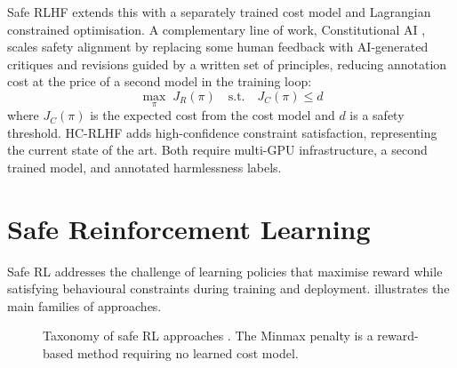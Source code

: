 \documentclass[a4paper,twoside,12pt]{report}
\begin{document}
Safe RLHF \citep{dai2024saferlhf} extends this with a separately trained cost model and
Lagrangian constrained optimisation. A complementary line of work, Constitutional AI
\citep{bai2022constitutional}, scales safety alignment by replacing some human feedback
with AI-generated critiques and revisions guided by a written set of principles, reducing
annotation cost at the price of a second model in the training loop:
\begin{equation}
  \max_{\pi}\; J_R(\pi) \quad \text{s.t.}\quad J_C(\pi) \leq d
  \label{eq:safe_rlhf}
\end{equation}
where $J_C(\pi)$ is the expected cost from the cost model and $d$ is a safety threshold.
HC-RLHF \citep{chittepu2025} adds high-confidence constraint satisfaction, representing the
current state of the art. Both require multi-GPU infrastructure, a second trained model, and
annotated harmlessness labels.

\section{Safe Reinforcement Learning}

Safe RL \citep{garcia2015comprehensive} addresses the challenge of learning policies that
maximise reward while satisfying behavioural constraints during training and deployment.
 illustrates the main families of approaches.

\begin{figure}[ht]
\centering
{}
\caption{Taxonomy of safe RL approaches \citep{garcia2015comprehensive}. The Minmax penalty
  is a reward-based method requiring no learned cost model.}
\label{fig:safe_rl_taxonomy}
\end{figure}
\end{document}
